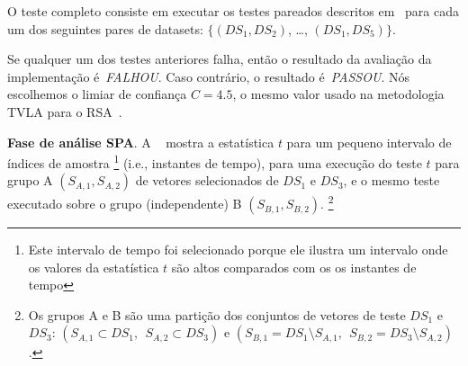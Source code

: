 \documentclass{SBCbookchapter}
\begin{document}
O teste completo consiste em executar os testes pareados descritos em~\cite{Witteman2011} para cada um dos seguintes pares de datasets: $\{(DS_1,DS_2)$, \dots, $(DS_1,DS_5) \}$.
%

%
Se qualquer um dos testes anteriores falha, então o resultado da avaliação da implementação é~\textit{FALHOU}. Caso contrário, o resultado é~\textit{PASSOU}. Nós escolhemos o limiar de confiança $C = 4.5$, o mesmo valor usado na metodologia TVLA para o RSA~\cite{Witteman2011}.
%
%

\noindent \textbf{Fase de análise SPA}. A ~ mostra a estatística $t$ para um pequeno intervalo de índices de amostra
%
%
\footnote{Este intervalo de tempo foi selecionado porque ele ilustra um intervalo onde os valores da estatística $t$ são altos comparados com os os instantes de tempo} (i.e., instantes de tempo),
%
%
para uma execução do teste $t$ para grupo A $(S_{A,1},S_{A,2})$ de vetores selecionados de $DS_1$ e $DS_3$, e o mesmo teste executado sobre o grupo (independente) B $(S_{B,1},S_{B,2})$.
%
%
\footnote{Os grupos A e B são uma partição dos conjuntos de vetores de teste $DS_1$ e $DS_3$: $(S_{A,1}\subset DS_1,\ \  S_{A,2}\subset DS_3)$ e $(S_{B,1} = DS_1\setminus S_{A,1},\ \ S_{B,2} = DS_3\setminus S_{A,2})$.} 
%
%
\end{document}

